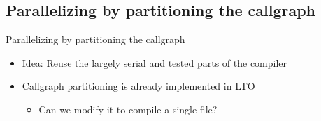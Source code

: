 \subsection{Parallelizing by partitioning the callgraph}

\begin{frame}{Parallelizing by partitioning the callgraph}

\begin{itemize}
    \item Idea: Reuse the largely serial and tested parts of the compiler
    \item Callgraph partitioning is already implemented in LTO
    \begin{itemize}
        \item Can we modify it to compile a single file?
    \end{itemize}
\end{itemize}
\end{frame}


